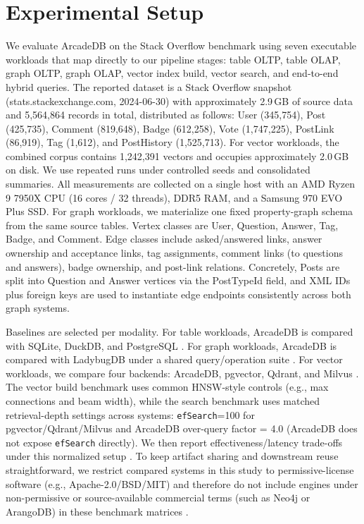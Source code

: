 \documentclass[sigconf, nonacm]{acmart}
\begin{document}
\section{Experimental Setup}

We evaluate ArcadeDB on the Stack Overflow benchmark using seven executable workloads that map directly to our pipeline stages: table OLTP, table OLAP, graph OLTP, graph OLAP, vector index build, vector search, and end-to-end hybrid queries. The reported dataset is a Stack Overflow snapshot (stats.stackexchange.com, 2024-06-30) with approximately 2.9\,GB of source data and 5,564,864 records in total, distributed as follows: User (345,754), Post (425,735), Comment (819,648), Badge (612,258), Vote (1,747,225), PostLink (86,919), Tag (1,612), and PostHistory (1,525,713). For vector workloads, the combined corpus contains 1,242,391 vectors and occupies approximately 2.0\,GB on disk. We use repeated runs under controlled seeds and consolidated summaries.
All measurements are collected on a single host with an AMD Ryzen 9 7950X CPU (16 cores / 32 threads), DDR5 RAM, and a Samsung 970 EVO Plus SSD.
For graph workloads, we materialize one fixed property-graph schema from the same source tables. Vertex classes are User, Question, Answer, Tag, Badge, and Comment. Edge classes include asked/answered links, answer ownership and acceptance links, tag assignments, comment links (to questions and answers), badge ownership, and post-link relations. Concretely, Posts are split into Question and Answer vertices via the PostTypeId field, and XML IDs plus foreign keys are used to instantiate edge endpoints consistently across both graph systems.

Baselines are selected per modality. For table workloads, ArcadeDB is compared with SQLite, DuckDB, and PostgreSQL \cite{Gaffney_2022,Raasveldt_2019,PostgreSQL_docs}. For graph workloads, ArcadeDB is compared with LadybugDB under a shared query/operation suite \cite{ladybug_docs}. For vector workloads, we compare four backends: ArcadeDB, pgvector, Qdrant, and Milvus \cite{pgvector_repo,qdrant_docs,milvus_docs}. The vector build benchmark uses common HNSW-style controls (e.g., max connections and beam width), while the search benchmark uses matched retrieval-depth settings across systems: \texttt{efSearch}=100 for pgvector/Qdrant/Milvus and ArcadeDB over-query factor = 4.0 (ArcadeDB does not expose \texttt{efSearch} directly). We then report effectiveness/latency trade-offs under this normalized setup \cite{malkov2016efficient,Pan_2024_vldbj}.
To keep artifact sharing and downstream reuse straightforward, we restrict compared systems in this study to permissive-license software (e.g., Apache-2.0/BSD/MIT) and therefore do not include engines under non-permissive or source-available commercial terms (such as Neo4j or ArangoDB) in these benchmark matrices \cite{neo4j_docs,arangodb_docs}.
\end{document}

